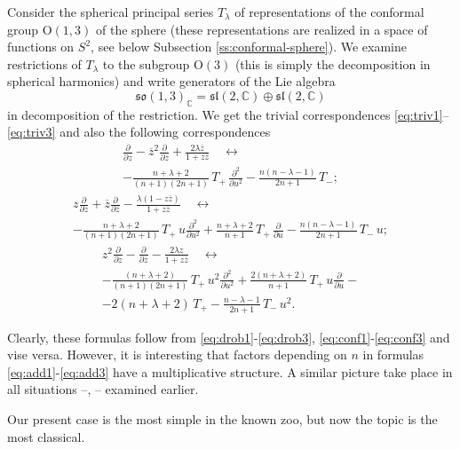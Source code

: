 \documentclass[]{amsart}
\newcounter{sec}
\renewcommand\O{\mathrm{O}}
\def\frl{\mathfrak l}
\def\fro{\mathfrak o}
\def\frs{\mathfrak s}
\def\C {{\mathbb C }}
\def\ov{\overline}
\begin{document}
Consider the spherical principal series $T_\lambda$ of representations
of the
conformal group $\O(1,3)$ of the sphere (these representations
are realized in a space
of functions on $S^2$, see below Subsection \ref{ss:conformal-sphere}).
We examine restrictions of $T_\lambda$
 to the subgroup $\O(3)$ (this is simply the decomposition
 in spherical harmonics) and write generators
of the Lie algebra
$$
\frs\fro(1,3)_\C=\frs\frl(2,\C)\oplus \frs\frl(2,\C)
$$
 in  decomposition of the restriction. We get the trivial
correspondences \eqref{eq:triv1}--\eqref{eq:triv3}
and also the following correspondences  
 \begin{multline}
\frac{\partial}{\partial z} - \ov z^2 \frac{\partial}{\partial \ov z}
+\frac{2\lambda \ov z}{1+z \ov z} \quad \longleftrightarrow
\\
 -\frac{n +\lambda+ 2}{(n+1)(2 n+1)}\,
T_+ \,\frac{\partial^2}{\partial u^2}  - 
 \frac{n (n -  \lambda - 1)}{2 n+1}\, T_-;
 \label{eq:add1} 
 \end{multline}
 \begin{multline}
z\frac{\partial}{\partial z} + \ov z \frac{\partial}{\partial \ov z}
-\frac{\lambda (1-z \ov z)}{1+z \ov z} \quad \longleftrightarrow
\\ 
- \frac{n+\lambda+2}{(n+1) (2 n+1)}\,
 T_+\, u \frac{\partial^2}{\partial u^2}+ 
 \frac{n+\lambda+2}{n+1}\, T_+ \,  \frac{\partial}{\partial u}
 -\frac{n(n-\lambda-1) }{2 n+1}\, T_- \,u;
\label{eq:add2} 
 \end{multline}
\begin{multline}
z^2\frac{\partial}{\partial z} -  \frac{\partial}{\partial \ov z}
-\frac{2\lambda z}{1+z \ov z} \quad \longleftrightarrow
\\
-\frac{(n+\lambda+2) }{(n+1) (2 n+1)}\, T_+ \, u^2\frac{\partial^2}{\partial u^2}
+\frac{2 (n+\lambda+2)}{n+1}\, T_+ \,u  \frac{\partial}{\partial u}
-
\\-2 (n+\lambda+2)\, T_+
-\frac{n-\lambda-1}{2 n+1} \,T_-\, u^2.
\label{eq:add3}
\end{multline} 

Clearly, these formulas follow from \eqref{eq:drob1}-\eqref{eq:drob3},
\eqref{eq:conf1}-\eqref{eq:conf3} and vise versa. However, it is interesting
that factors depending on $n$ in formulas \eqref{eq:add1}-\eqref{eq:add3}
have a multiplicative structure. A similar picture take place in all  situations
\cite{Mol1}--\cite{Mol3}, \cite{Ner1}--\cite{Ner-Lob} examined earlier.

Our present case is the most simple in the known zoo, but now
 the topic is the most classical. 
\end{document}
